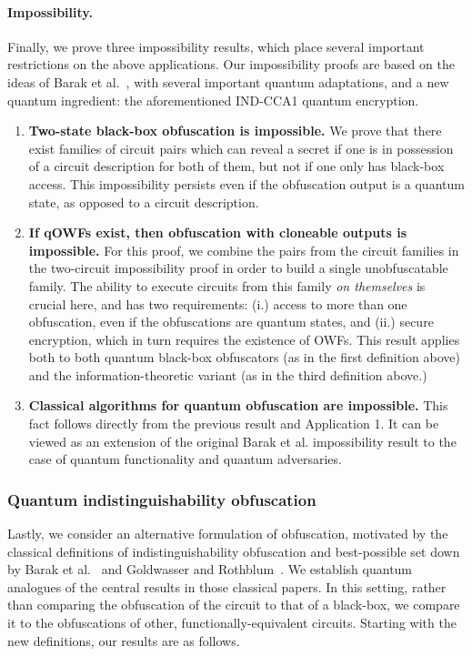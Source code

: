 \documentclass[11pt]{article}
\numberwithin{equation}{section}
\begin{document}
{\paragraph{Impossibility.} Finally, we prove three impossibility results, which place several important restrictions on the above applications. Our impossibility proofs are based on the ideas of Barak et al.~\cite{BGIRSVY12}, with several important quantum adaptations, and a new quantum ingredient: the aforementioned IND-CCA1 quantum encryption.
\begin{enumerate}
\item \textbf{Two-state black-box obfuscation is impossible.} We prove that there exist families of circuit pairs which can reveal a secret if one is in possession of a circuit description for both of them, but not if one only has black-box access. This impossibility persists even if the obfuscation output is a quantum state, as opposed to a circuit description.
\item \textbf{If qOWFs exist, then obfuscation with cloneable outputs is impossible.} For this proof, we combine the pairs from the circuit families in the two-circuit impossibility proof in order to build a single unobfuscatable family. The ability to execute circuits from this family \emph{on themselves} is crucial here, and has two requirements: (i.) access to more than one obfuscation, even if the obfuscations are quantum states, and (ii.) secure encryption, which in turn requires the existence of OWFs. This result applies both to both quantum black-box obfuscators (as in the first definition above) and the information-theoretic variant (as in the third definition above.) 
\item \textbf{Classical algorithms for quantum obfuscation are impossible.} This fact follows directly from the previous result and Application 1. It can be viewed as an extension of the original Barak et al. impossibility result to the case of quantum functionality and quantum adversaries.
\end{enumerate}

\subsubsection{Quantum indistinguishability obfuscation}

Lastly, we consider an alternative formulation of obfuscation, motivated by the classical definitions of indistinguishability obfuscation and best-possible set down by Barak et al.~\cite{BGIRSVY12} and Goldwasser and Rothblum~\cite{GR07}. We establish quantum analogues of the central results in those classical papers. In this setting, rather than comparing the obfuscation of the circuit to that of a black-box, we compare it to the obfuscations of other, functionally-equivalent circuits. Starting with the new definitions, our results are as follows.

}
\end{document}
